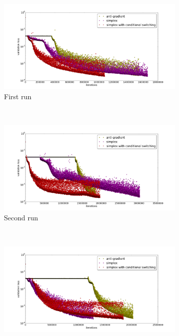 \begin{figure}[h]
	\begin{subfigure}{1.\textwidth}
		\centering
		\includegraphics[width= 1\textwidth]{chapter4/compare_add_simplex_13.png}
		\caption{First run}
		\label{fig:a:comparisong_add_simplex}
	\end{subfigure}\\
	\begin{subfigure}{1.\textwidth}
		\centering
		\includegraphics[width= 1\textwidth]{chapter4/compare_add_simplex_14.png}
		\caption{Second run}
		\label{fig:b:comparisong_add_simplex}
	\end{subfigure}\\
	\begin{subfigure}{1.\textwidth}
		\centering
		\includegraphics[width= 1\textwidth]{chapter4/compare_add_simplex_15.png}

\end{subfigure}
\end{figure}
